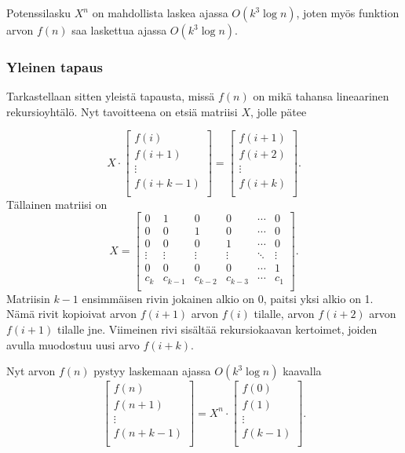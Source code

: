 Potenssilasku $X^n$ on mahdollista laskea ajassa
$O(k^3 \log n)$,
joten myös funktion arvon $f(n)$
saa laskettua ajassa $O(k^3 \log n)$.

\subsubsection{Yleinen tapaus}

Tarkastellaan sitten yleistä tapausta,
missä $f(n)$ on mikä tahansa lineaarinen
rekursioyhtälö. Nyt tavoitteena on etsiä
matriisi $X$, jolle pätee

\[ X \cdot
 \begin{bmatrix}
  f(i) \\
  f(i+1) \\
  \vdots \\
  f(i+k-1) \\
 \end{bmatrix}
=
 \begin{bmatrix}
  f(i+1) \\
  f(i+2) \\
  \vdots \\
  f(i+k) \\
 \end{bmatrix}.
\]
Tällainen matriisi on
\[
X =
 \begin{bmatrix}
  0 & 1 & 0 & 0 & \cdots & 0 \\
  0 & 0 & 1 & 0 & \cdots & 0 \\
  0 & 0 & 0 & 1 & \cdots & 0 \\
  \vdots & \vdots & \vdots & \vdots & \ddots & \vdots \\
  0 & 0 & 0 & 0 & \cdots & 1 \\
  c_k & c_{k-1} & c_{k-2} & c_{k-3} & \cdots & c_1 \\
 \end{bmatrix}.
\]
Matriisin $k-1$ ensimmäisen rivin jokainen alkio on 0,
paitsi yksi alkio on 1.
Nämä rivit kopioivat
arvon $f(i+1)$ arvon $f(i)$ tilalle,
arvon $f(i+2)$ arvon $f(i+1)$ tilalle jne.
Viimeinen rivi sisältää rekursiokaavan kertoimet,
joiden avulla muodostuu uusi arvo $f(i+k)$.

\begin{samepage}
Nyt arvon $f(n)$ pystyy laskemaan ajassa $O(k^3 \log n)$
kaavalla
\[
 \begin{bmatrix}
  f(n) \\
  f(n+1) \\
  \vdots \\
  f(n+k-1) \\
 \end{bmatrix}
=
X^n \cdot
 \begin{bmatrix}
  f(0) \\
  f(1) \\
  \vdots \\
  f(k-1) \\
 \end{bmatrix}.
\]
\end{samepage}

